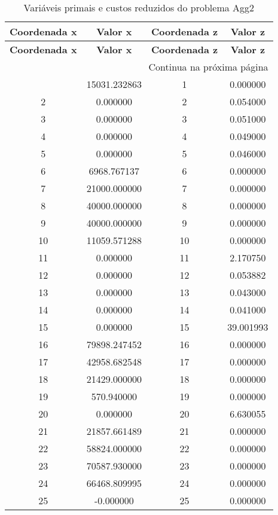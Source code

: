 \documentclass[12pt]{article}
\begin{document}
\begin{longtable}{@{}cccc@{}}
\caption{Variáveis primais e custos reduzidos do problema Agg2} \\
\toprule
\textbf{Coordenada x} & \textbf{Valor x} & \textbf{Coordenada z} & \textbf{Valor z} \\
\midrule
\endfirsthead

\toprule
\textbf{Coordenada x} & \textbf{Valor x} & \textbf{Coordenada z} & \textbf{Valor z} \\
\midrule
\endhead

\midrule \multicolumn{4}{r}{{Continua na próxima página}} \\ \midrule
\endfoot

\bottomrule
\endlastfoot
1 & 15031.232863 & 1 & 0.000000 \\
2 & 0.000000 & 2 & 0.054000 \\
3 & 0.000000 & 3 & 0.051000 \\
4 & 0.000000 & 4 & 0.049000 \\
5 & 0.000000 & 5 & 0.046000 \\
6 & 6968.767137 & 6 & 0.000000 \\
7 & 21000.000000 & 7 & 0.000000 \\
8 & 40000.000000 & 8 & 0.000000 \\
9 & 40000.000000 & 9 & 0.000000 \\
10 & 11059.571288 & 10 & 0.000000 \\
11 & 0.000000 & 11 & 2.170750 \\
12 & 0.000000 & 12 & 0.053882 \\
13 & 0.000000 & 13 & 0.043000 \\
14 & 0.000000 & 14 & 0.041000 \\
15 & 0.000000 & 15 & 39.001993 \\
16 & 79898.247452 & 16 & 0.000000 \\
17 & 42958.682548 & 17 & 0.000000 \\
18 & 21429.000000 & 18 & 0.000000 \\
19 & 570.940000 & 19 & 0.000000 \\
20 & 0.000000 & 20 & 6.630055 \\
21 & 21857.661489 & 21 & 0.000000 \\
22 & 58824.000000 & 22 & 0.000000 \\
23 & 70587.930000 & 23 & 0.000000 \\
24 & 66468.809995 & 24 & 0.000000 \\
25 & -0.000000 & 25 & 0.000000 \\

\end{longtable}
\end{document}
